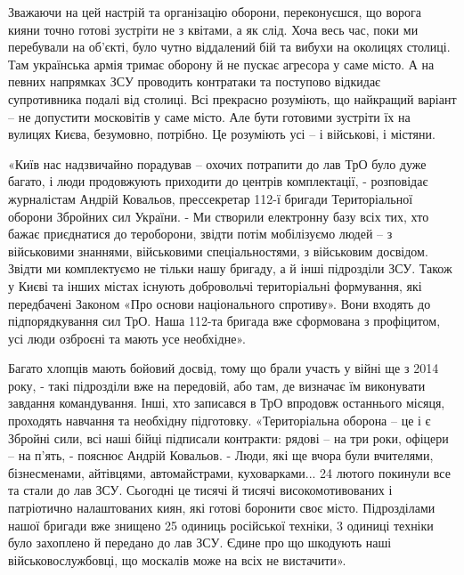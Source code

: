 
Зважаючи на цей настрій та організацію оборони, переконуєшся, що ворога кияни
точно готові зустріти не з квітами, а як слід. Хоча весь час, поки ми
перебували на об'єкті, було чутно віддалений бій та вибухи на околицях столиці.
Там українська армія тримає оборону й не пускає агресора у саме місто. А на
певних напрямках ЗСУ проводить контратаки та поступово відкидає супротивника
подалі від столиці. Всі прекрасно розуміють, що найкращий варіант – не
допустити московітів у саме місто. Але бути готовими зустріти їх на вулицях
Києва, безумовно, потрібно. Це розуміють усі – і військові, і містяни.


«Київ нас надзвичайно порадував – охочих потрапити до лав ТрО було дуже багато,
і люди продовжують приходити до центрів комплектації, - розповідає журналістам
Андрій Ковальов, прессекретар 112-ї бригади Територіальної оборони Збройних сил
України. - Ми створили електронну базу всіх тих, хто бажає приєднатися до
тероборони, звідти потім мобілізуємо людей – з військовими знаннями,
військовими спеціальностями, з військовим досвідом. Звідти ми комплектуємо не
тільки нашу бригаду, а й інші підрозділи ЗСУ. Також у Києві та інших містах
існують добровольчі територіальні формування, які передбачені Законом «Про
основи національного спротиву». Вони входять до підпорядкування сил ТрО. Наша
112-та бригада вже сформована з профіцитом, усі люди озброєні та мають усе
необхідне».


Багато хлопців мають бойовий досвід, тому що брали участь у війні ще з 2014
року, - такі підрозділи вже на передовій, або там, де визначає їм виконувати
завдання командування. Інші, хто записався в ТрО впродовж останнього місяця,
проходять навчання та необхідну підготовку. «Територіальна оборона – це і є
Збройні сили, всі наші бійці підписали контракти: рядові – на три роки, офіцери
– на п'ять, - пояснює Андрій Ковальов. - Люди, які ще вчора були вчителями,
бізнесменами, айтівцями, автомайстрами, куховарками... 24 лютого покинули все та
стали до лав ЗСУ. Сьогодні це тисячі й тисячі високомотивованих і патріотично
налаштованих киян, які готові боронити своє місто. Підрозділами нашої бригади
вже знищено 25 одиниць російської техніки, 3 одиниці техніки було захоплено й
передано до лав ЗСУ. Єдине про що шкодують наші військовослужбовці, що москалів
може на всіх не вистачити».

